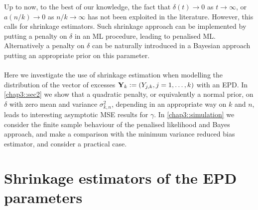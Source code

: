 \vspace{0.3cm}\noindent
Up to now, to the best of our knowledge, the fact that $\delta (t) \to 0$ as $t \to \infty$, or $a(n/k)\to 0$ as $n/k \to \infty$ has not been exploited in the literature. However, this calls for shrinkage estimators.
Such shrinkage approach can be implemented by putting a penalty on $\delta$ in an ML procedure, leading to penalised ML. Alternatively a penalty on $\delta$ can be naturally introduced in a Bayesian approach putting an appropriate prior on this parameter. 
\\\\
Here we investigate the use of shrinkage estimation when modelling the distribution of the vector of excesses ${\bf Y}_k := \left( Y_{j,k}, j=1,\ldots,k \right)$
with an EPD. In \autoref{chap3::sec2} we show that a quadratic penalty, or equivalently a normal prior, on $\delta$ with zero mean and variance $\sigma^2_{k,n}$, depending in an appropriate way on $k$ and $n$, leads to interesting asymptotic MSE results for $\gamma$. In \autoref{chap3::simulation} we 
consider the finite sample behaviour of the penalised likelihood and Bayes approach, and make a comparison with the minimum variance reduced bias estimator, and consider a practical case. 

\section{Shrinkage estimators of the EPD parameters}\label{chap3::sec2}

